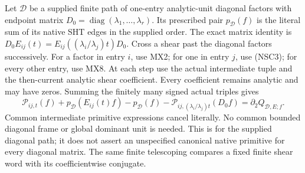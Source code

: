 Let $\mathcal D$ be a supplied finite path of one-entry
analytic-unit diagonal factors with endpoint matrix
$D_0=\operatorname{diag}(\lambda_1,\ldots,\lambda_r)$.
Its prescribed pair $p_{\mathcal D}(f)$ is the literal
sum of its native SHT edges in the supplied order.
The exact matrix identity is
$D_0E_{ij}(t)=E_{ij}((\lambda_i/\lambda_j)t)D_0$.
Cross a shear past the diagonal factors successively.
For a factor in entry $i$, use MX2; for one in entry
$j$, use (NSC3); for every other entry, use MX8.
At each step use the actual intermediate tuple and
the then-current analytic shear coefficient.
Every coefficient remains analytic and may have zeros.
Summing the finitely many signed actual triples gives
\[
 \mathcal P_{ij,t}(f)+p_{\mathcal D}(E_{ij}(t)f)
       -p_{\mathcal D}(f)
       -\mathcal P_{ij,(\lambda_i/\lambda_j)t}(D_0f)
                              =\partial_2Q_{\mathcal D,E;f}.
 \tag{NSC28}
\]
Common intermediate primitive expressions cancel literally.
No common bounded diagonal frame or global dominant
unit is needed.  This is for the supplied diagonal
path; it does not assert an unspecified canonical
native primitive for every diagonal matrix.
The same finite telescoping compares a fixed finite
shear word with its coefficientwise conjugate.

